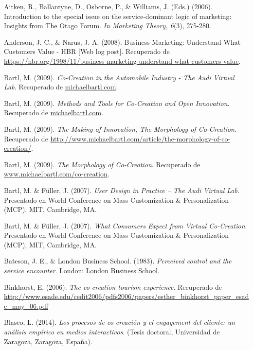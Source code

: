 


\begin{thebibliography}{11}
	
	\bibitem{}
		Aitken, R., Ballantyne, D., Osborne, P.,  \& Williams, J. (Eds.) (2006). Introduction to the special issue on the service-dominant logic of marketing: Insights from The Otago Forum. \emph{In Marketing Theory, 6}(3), 275-280.

	\bibitem{}
		Anderson, J. C., \& Narus, J. A. (2008). Business Marketing: Understand What Customers Value - HBR [Web log post]. Recuperado de  \url{https://hbr.org/1998/11/business-marketing-understand-what-customers-value}.

	\bibitem{}
		Bartl, M. (2009). \emph{Co-Creation in the Automobile Industry - The Audi Virtual Lab}. Recuperado de \url{michaelbartl.com}. 	

	\bibitem{}
		Bartl, M. (2009). \emph{Methods and Tools for Co-Creation and Open Innovation}. Recuperado de \url{michaelbartl.com}. 

	\bibitem{}
		Bartl, M. (2009). \emph{The Making-of Innovation, The Morphology of Co-Creation}. Recuperado de \url{http://www.michaelbartl.com/article/the-morphology-of-co-creation/}. 

		
	\bibitem{}
		Bartl, M. (2009). \emph{The Morphology of Co-Creation}. Recuperado de \url{www.michaelbartl.com/co-creation}. 

	\bibitem{}
		Bartl, M. \& Füller, J. (2007). \emph {User Design in Practice – The Audi Virtual Lab}. Presentado en World Conference on Mass Customization \& Personalization  (MCP), MIT, Cambridge, MA. 

	\bibitem{}
		Bartl, M. \& Füller, J. (2007). \emph {What Consumers Expect from Virtual Co-Creation}. Presentado en World Conference on Mass Customization \& Personalization  (MCP), MIT, Cambridge, MA. 

	\bibitem{}
		Bateson, J. E., \& London Business School. (1983). \emph{Perceived control and the service encounter}. London: London Business School. 
	
	\bibitem{}
		Binkhorst, E. (2006).  \emph{The co-creation tourism experience}. Recuperado de \url{http://www.esade.edu/cedit2006/pdfs2006/papers/esther_binkhorst_paper_esade_may_06.pdf}	 

	\bibitem{}
		Blasco, L. (2014). \emph{Los procesos de co-creación y el engagement del cliente: un análisis empírico en medios interactivos}. (Tesis doctoral, Universidad de Zaragoza, Zaragoza, España). 


\end{thebibliography}
